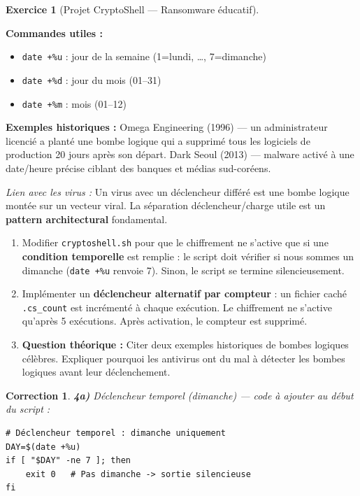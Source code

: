 \documentclass[a4paper,11pt]{article}
\theoremstyle{plain}
\newtheorem{correction}{Correction}
\theoremstyle{definition}
\newtheorem{exercice}{Exercice}
\begin{document}
\begin{exercice}[Projet CryptoShell --- Ransomware éducatif]
\begin{rappel}
\medskip
\textbf{Commandes utiles :}
\begin{itemize}
    \item \texttt{date +\%u} : jour de la semaine (1=lundi, \ldots, 7=dimanche)
    \item \texttt{date +\%d} : jour du mois (01--31)
    \item \texttt{date +\%m} : mois (01--12)
\end{itemize}

\medskip
\textbf{Exemples historiques :} Omega Engineering (1996) --- un administrateur licencié a planté une bombe logique qui a supprimé tous les logiciels de production 20 jours après son départ. Dark Seoul (2013) --- malware activé à une date/heure précise ciblant des banques et médias sud-coréens.

\medskip
\textit{Lien avec les virus :} Un virus avec un déclencheur différé est une bombe logique montée sur un vecteur viral. La séparation déclencheur/charge utile est un \textbf{pattern architectural} fondamental.
\end{rappel}

\begin{enumerate}
\item[\textbf{4a)}] Modifier \texttt{cryptoshell.sh} pour que le chiffrement ne s'active que si une \textbf{condition temporelle} est remplie : le script doit vérifier si nous sommes un dimanche (\texttt{date +\%u} renvoie 7). Sinon, le script se termine silencieusement.

\item[\textbf{4b)}] Implémenter un \textbf{déclencheur alternatif par compteur} : un fichier caché \texttt{.cs\_count} est incrémenté à chaque exécution. Le chiffrement ne s'active qu'après 5 exécutions. Après activation, le compteur est supprimé.

\item[\textbf{4c)}] \textbf{Question théorique :} Citer deux exemples historiques de bombes logiques célèbres. Expliquer pourquoi les antivirus ont du mal à détecter les bombes logiques avant leur déclenchement.
\end{enumerate}

\begin{correction}

\textbf{4a)} Déclencheur temporel (dimanche) --- code à ajouter au début du script :
\begin{lstlisting}[title=Déclencheur temporel]
# Déclencheur temporel : dimanche uniquement
DAY=$(date +%u)
if [ "$DAY" -ne 7 ]; then
    exit 0   # Pas dimanche -> sortie silencieuse
fi
\end{lstlisting}


\end{correction}
\end{exercice}
\end{document}
